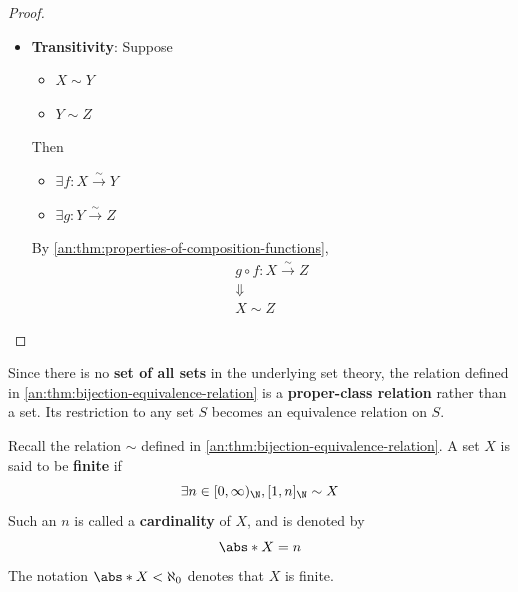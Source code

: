 \begin{proof}
\begin{itemize}
\[\begin{array}{c}
              \Downarrow                                                  \\
              Y \sim X
            \end{array}
          \]
    \item \textbf{Transitivity}: Suppose
          \begin{itemize}
            \item $X \sim Y$
            \item $Y \sim Z$
          \end{itemize}
          Then
          \begin{itemize}
            \item $\exists f: X \xrightarrow{\sim} Y$
            \item $\exists g: Y \xrightarrow{\sim} Z$
          \end{itemize}
          By \cref{an:thm:properties-of-composition-functions},
          \[
            \begin{array}{c}
              g \circ f: X \xrightarrow{\sim} Z \\
              \Downarrow                        \\
              X \sim Z
            \end{array}
          \]
  \end{itemize}
\end{proof}

\bigskip

\begin{remark}
  Since there is no \textbf{set of all sets} in the underlying set theory, the relation defined in
  \cref{an:thm:bijection-equivalence-relation} is a \textbf{proper-class relation} rather than a set. Its
  restriction to any set $S$ becomes an equivalence relation on $S$.
\end{remark}

\bigskip

\begin{definition} \label{an:def:finite-and-countable-sets}
  Recall the relation $\sim$ defined in \cref{an:thm:bijection-equivalence-relation}.
  A set $X$ is said to be \textbf{finite} if
  \[
    \exists n \in [0, \infty)_{\N}, [1, n]_{\N} \sim X
  \]
  Such an $n$ is called a \textbf{cardinality} of $X$, and is denoted by
  \[
    \abs*{X} = n
  \]
  The notation $\abs*{X} < \aleph_{0}$ denotes that $X$ is finite.
\end{definition}

\bigskip

